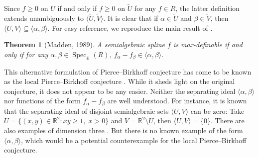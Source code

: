 \documentclass[11pt]{amsart}
\theoremstyle{plain}
\newtheorem{theorem}{Theorem}[section]
\theoremstyle{definition}
\DeclareMathOperator{\Spec}{Spec}
\begin{document}
Since $f \ge 0$ on $U$ if and only if $f \ge 0$ on $\widetilde{U}$ for any $f \in R$, the latter definition extends unambiguously to $\langle \widetilde{U}, \widetilde{V} \rangle$. It is clear that if $\alpha \in \widetilde{U}$ and $\beta \in \widetilde{V}$, then $\langle U, V \rangle \subseteq \langle \alpha, \beta \rangle$. For easy reference, we reproduce the main result of \cite{Madden1989}.
\begin{theorem}[Madden, 1989]\label{thm:madden}
A semialgebraic spline $f$ is max-definable if and only if for any $\alpha, \beta \in \Spec_{\mathbb{R}}(R)$, $f_\alpha - f_\beta \in \langle \alpha, \beta \rangle$.
\end{theorem}
This alternative formulation of Pierce--Birkhoff conjecture has come to be known as the local Pierce--Birkhoff conjecture \cite{Lucas15}. While it sheds light on the original conjecture, it does not appear to be any easier. Neither the separating ideal $\langle \alpha, \beta \rangle$ nor functions of the form $f_\alpha - f_\beta$ are well understood. For instance, it is known that the separating ideal of disjoint semialgebraic sets $\langle U, V \rangle$ can be zero: Take $U = \{(x, y)\in \mathbb{R}^2 : xy \ge 1, \; x > 0\}$ and $V  = \mathbb{R}^2 \setminus U$, then $\langle U, V \rangle = \{0\}$. There are also examples of dimension three \cite{B88}. But there is no known example of the form $\langle \alpha, \beta \rangle$, which would be a potential counterexample for the local Pierce--Birkhoff conjecture.
\end{document}
